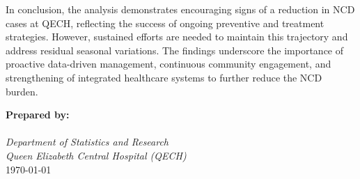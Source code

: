 \documentclass[12pt,a4paper]{report}
\begin{document}
\noindent
In conclusion, the analysis demonstrates encouraging signs of a reduction in NCD cases at QECH, reflecting the success of ongoing preventive and treatment strategies. However, sustained efforts are needed to maintain this trajectory and address residual seasonal variations. The findings underscore the importance of proactive data-driven management, continuous community engagement, and strengthening of integrated healthcare systems to further reduce the NCD burden.

\vspace{1cm}
\noindent
\textbf{Prepared by:} \\
                       \\
\textit{Department of Statistics and Research} \\
\textit{Queen Elizabeth Central Hospital (QECH)} \\
\today
\end{document}
